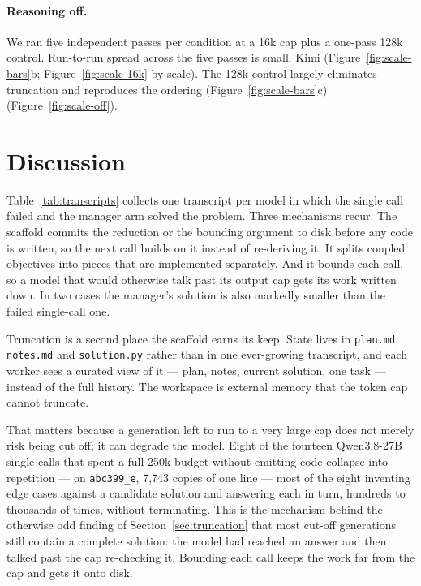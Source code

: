 \documentclass{article}
\begin{document}
\paragraph{Reasoning off.} We ran five independent
passes per condition at a 16k cap plus a one-pass 128k control. Run-to-run spread across the
five passes is small. Kimi 
(Figure~\ref{fig:scale-bars}b; Figure~\ref{fig:scale-16k} by scale). The 128k control largely eliminates truncation and reproduces the ordering
(Figure~\ref{fig:scale-bars}c) (Figure~\ref{fig:scale-off}).

\section{Discussion}
\label{sec:discussion}

Table~\ref{tab:transcripts} collects one transcript per model in which the single call failed
and the manager arm solved the problem. Three mechanisms recur. The scaffold commits the
reduction or the bounding argument to disk before any code is written, so the next call builds
on it instead of re-deriving it. It splits coupled objectives into pieces that are implemented
separately. And it bounds each call, so a model that would otherwise talk past its output cap
gets its work written down. In two cases the manager's solution is also markedly smaller than
the failed single-call one.

Truncation is a second place the scaffold earns its keep. State lives in \texttt{plan.md},
\texttt{notes.md} and \texttt{solution.py} rather than in one ever-growing transcript, and
each worker sees a curated view of it --- plan, notes, current solution, one task --- instead
of the full history. The workspace is external memory that the token cap cannot truncate.

That matters because a generation left to run to a very large cap does not merely risk being
cut off; it can degrade the model. Eight of the fourteen Qwen3.8-27B single calls that spent a
full 250k budget without emitting code collapse into repetition --- on \texttt{abc399\_e},
7{,}743 copies of one line --- most of the eight inventing edge cases against a candidate
solution and answering each in turn, hundreds to thousands of times, without terminating. This
is the mechanism behind the otherwise odd finding of Section~\ref{sec:truncation} that most
cut-off generations still contain a complete solution: the model had reached an answer and
then talked past the cap re-checking it. Bounding each call keeps the work far from the cap and
gets it onto disk.
\end{document}
